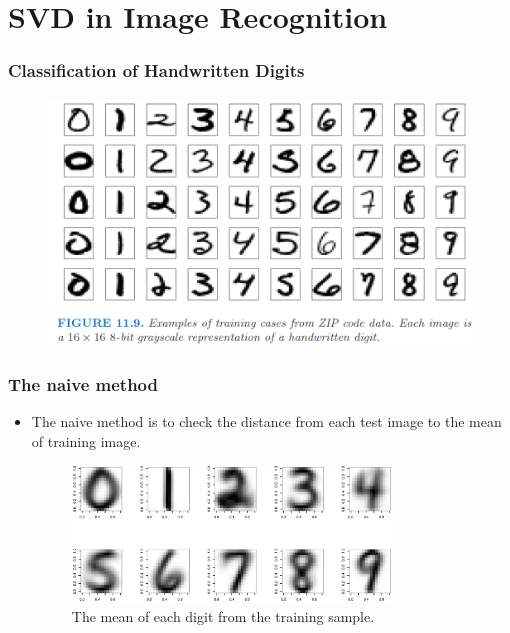 \documentclass[10pt]{beamer}
\begin{document}
\section{SVD in Image Recognition}


\begin{frame}
  \frametitle{Classification of Handwritten Digits}

  \begin{figure}
    \centering
    \includegraphics[height=0.75\textheight]{Digits}
  \end{figure}

\end{frame}

\begin{frame}

\frametitle{The naive method}
\begin{itemize}

\item The naive method is to check the distance from each test image to the
  mean of training image.

\begin{figure}
  \centering
  \includegraphics[width=0.8\textwidth]{image-mean}
  \caption{The mean of each digit from the training sample.}
  \label{fig:sampledigit}
\end{figure}
\end{itemize}
\end{frame}
\end{document}
